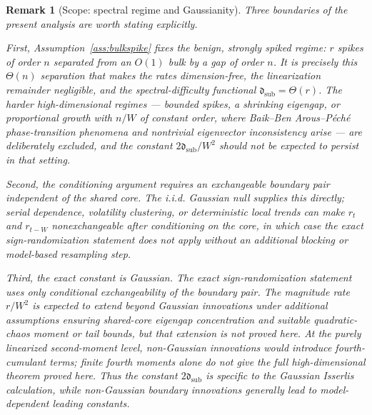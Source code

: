 \documentclass[11pt]{article}
\theoremstyle{tightplain}
\theoremstyle{tightdef}
\newtheorem{remark}[theorem]{Remark}
\begin{document}
\begin{remark}[Scope: spectral regime and Gaussianity]\label{rem:scope}
Three boundaries of the present analysis are worth stating explicitly.

First, Assumption~\ref{ass:bulkspike} fixes the benign, strongly spiked
regime: $r$ spikes of order $n$ separated from an $O(1)$ bulk by a gap of order
$n$. It
is precisely this $\Theta(n)$ separation that makes the rates dimension-free,
the linearization remainder negligible, and the spectral-difficulty functional
$\mathfrak d_{\mathrm{sub}}=\Theta(r)$. The harder high-dimensional regimes ---
bounded spikes, a shrinking eigengap, or proportional growth with $n/W$ of
constant order, where Baik--Ben Arous--P\'ech\'e phase-transition phenomena and
nontrivial eigenvector inconsistency arise --- are deliberately excluded, and
the constant $2\mathfrak d_{\mathrm{sub}}/W^2$ should not be expected to persist
in that setting.

Second, the conditioning argument requires an exchangeable boundary pair
independent of the shared core. The i.i.d. Gaussian null supplies this directly;
serial dependence, volatility clustering, or deterministic local trends can
make $r_t$ and $r_{t-W}$ nonexchangeable after conditioning on the core, in
which case the exact sign-randomization statement does not apply without an
additional blocking or model-based resampling step.

Third, the \emph{exact constant} is Gaussian. The exact sign-randomization
statement uses only conditional exchangeability of the boundary pair. The
magnitude rate $r/W^2$ is expected to extend beyond Gaussian innovations under
additional assumptions ensuring shared-core eigengap concentration and suitable
quadratic-chaos moment or tail bounds, but that extension is not proved here. At
the purely linearized second-moment level, non-Gaussian innovations would
introduce fourth-cumulant terms; finite fourth moments alone do not give the
full high-dimensional theorem proved here. Thus the constant
$2\mathfrak d_{\mathrm{sub}}$ is specific to the Gaussian Isserlis calculation,
while non-Gaussian boundary innovations generally lead to model-dependent
leading constants.
\end{remark}
\end{document}
